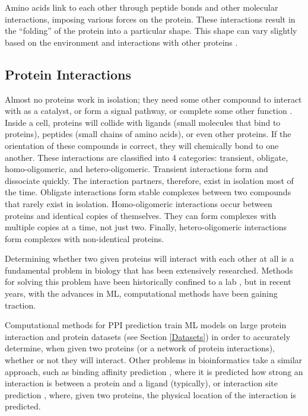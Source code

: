 \documentclass{article}
\begin{document}
Amino acids link to each other through peptide bonds and other molecular interactions, imposing various forces on the protein. These interactions result in the ``folding'' of the protein into a particular shape. This shape can vary slightly based on the environment and interactions with other proteins \citep{alberts_shape_2002}. 

\subsection{Protein Interactions}
Almost no proteins work in isolation; they need some other compound to interact with as a catalyst, or form a signal pathway, or complete some other function \citep{morris_uncovering_2022}. Inside a cell, proteins will collide with ligands (small molecules that bind to proteins), peptides (small chains of amino acids), or even other proteins. If the orientation of these compounds is correct, they will chemically bond to one another. These interactions are classified into 4 categories: transient, obligate, homo-oligomeric, and hetero-oligomeric. Transient interactions form and dissociate quickly. The interaction partners, therefore, exist in isolation most of the time. Obligate interactions form stable complexes between two compounds that rarely exist in isolation. Homo-oligomeric interactions occur between proteins and identical copies of themselves. They can form complexes with multiple copies at a time, not just two. Finally, hetero-oligomeric interactions form complexes with non-identical proteins. 

Determining whether two given proteins will interact with each other at all is a fundamental problem in biology that has been extensively researched. Methods for solving this problem have been historically confined to a lab \cite{akbarzadeh_studying_2024}, but in recent years, with the advances in ML, computational methods have been gaining traction.

Computational methods for PPI prediction train ML models on large protein interaction and protein datasets (see Section \ref{Datasets}) in order to accurately determine, when given two proteins (or a network of protein interactions), whether or not they will interact. Other problems in bioinformatics take a similar approach, such as binding affinity prediction \citep{stephenson_recent_2025}, where it is predicted how strong an interaction is between a protein and a ligand (typically), or interaction site prediction \citep{aumentado-armstrong_algorithmic_2015}, where, given two proteins, the physical location of the interaction is predicted.
\end{document}
